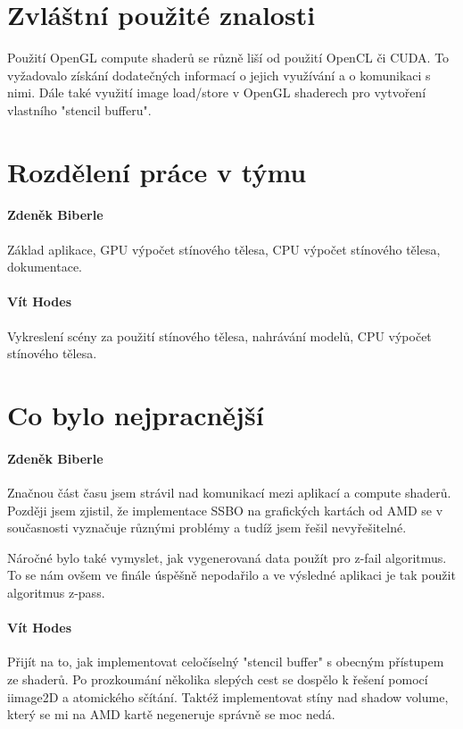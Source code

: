 \documentclass[11pt,a4paper]{article}
\begin{document}
\section{Zvláštní použité znalosti}

Použití OpenGL compute shaderů se různě liší od použití OpenCL či CUDA. To vyžadovalo získání dodatečných informací o jejich využívání a o komunikaci s nimi. Dále také využití image load/store v OpenGL shaderech pro vytvoření vlastního "stencil bufferu".

\section{Rozdělení práce v týmu}

\paragraph{Zdeněk Biberle} Základ aplikace, GPU výpočet stínového tělesa, CPU výpočet stínového tělesa, dokumentace.
\paragraph{Vít Hodes} Vykreslení scény za použití stínového tělesa, nahrávání modelů, CPU výpočet stínového tělesa.

\section{Co bylo nejpracnější}

\paragraph{Zdeněk Biberle}
Značnou část času jsem strávil nad komunikací mezi aplikací a compute shaderů. Později jsem zjistil, že implementace SSBO na grafických kartách od AMD se v současnosti vyznačuje různými problémy a tudíž jsem řešil nevyřešitelné. 

Náročné bylo také vymyslet, jak vygenerovaná data použít pro z-fail algoritmus. To se nám ovšem ve finále úspěšně nepodařilo a ve výsledné aplikaci je tak použit algoritmus z-pass.

\paragraph{Vít Hodes} Přijít na to, jak implementovat celočíselný "stencil buffer" s obecným přístupem ze shaderů. Po prozkoumání několika slepých cest se dospělo k řešení pomocí iimage2D a atomického sčítání. Taktéž implementovat stíny nad shadow volume, který se mi na AMD kartě negeneruje správně se moc nedá.
\end{document}
